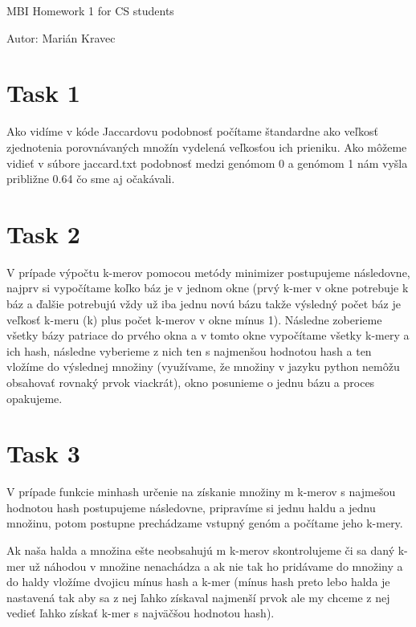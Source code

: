 \documentclass[a4paper]{article}
\begin{document}
 
	
\pagestyle{plain}

\begin{center}
	\sc\large
	MBI Homework 1 for CS students
\end{center}

Autor: Marián Kravec

\section{Task 1}

Ako vidíme v kóde Jaccardovu podobnosť počítame štandardne ako veľkosť zjednotenia porovnávaných množín vydelená veľkosťou ich prieniku. Ako môžeme vidieť v súbore jaccard.txt podobnosť medzi genómom 0 a genómom 1 nám vyšla približne 0.64 čo sme aj očakávali. 

\section{Task 2}

V prípade výpočtu k-merov pomocou metódy minimizer postupujeme následovne, najprv si vypočítame koľko báz je v jednom okne (prvý k-mer v okne potrebuje k báz a ďalšie potrebujú vždy už iba jednu novú bázu takže výsledný počet báz je veľkosť k-meru (k) plus počet k-merov v okne mínus 1). Následne zoberieme všetky bázy patriace do prvého okna a v tomto okne vypočítame všetky k-mery a ich hash, následne vyberieme z nich ten s najmenšou hodnotou hash a ten vložíme do výslednej množiny (využívame, že množiny v jazyku python nemôžu obsahovať rovnaký prvok viackrát), okno posunieme o jednu bázu a proces opakujeme.

\section{Task 3}

V prípade funkcie minhash určenie na získanie množiny m k-merov s najmešou hodnotou hash postupujeme následovne, pripravíme si jednu haldu a jednu množinu, potom postupne prechádzame vstupný genóm a počítame jeho k-mery. 

Ak naša halda a množina ešte neobsahujú m k-merov skontrolujeme či sa daný k-mer už náhodou v množine nenachádza a ak nie tak ho pridávame do množiny a do haldy vložíme dvojicu mínus hash a k-mer (mínus hash preto lebo halda je nastavená tak aby sa z nej ľahko získaval najmenší prvok ale my chceme z nej vedieť ľahko získať k-mer s najväčšou hodnotou hash). 
\end{document}
